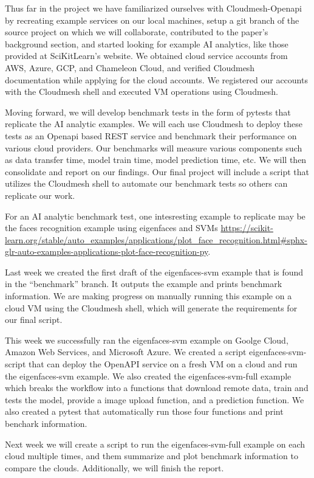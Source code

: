 Thus far in the project we have familiarized ourselves with
Cloudmesh-Openapi by recreating example services on our local machines,
setup a git branch of the source project on which we will collaborate,
contributed to the paper's background section, and started looking for
example AI analytics, like those provided at SciKitLearn's website. We
obtained cloud service accounts from AWS, Azure, GCP, and Chameleon
Cloud, and verified Cloudmesh documentation while applying for the cloud
accounts. We registered our accounts with the Cloudmesh shell and
executed VM operations using Cloudmesh.

Moving forward, we will develop benchmark tests in the form of pytests
that replicate the AI analytic examples. We will each use Cloudmesh to
deploy these tests as an Openapi based REST service and benchmark their
performance on various cloud providers. Our benchmarks will measure
various components such as data transfer time, model train time, model
prediction time, etc. We will then consolidate and report on our
findings. Our final project will include a script that utilizes the
Cloudmesh shell to automate our benchmark tests so others can replicate
our work.

For an AI analytic benchmark test, one intesresting example to replicate
may be the faces recognition example using eigenfaces and SVMs
\url{https://scikit-learn.org/stable/auto_examples/applications/plot_face_recognition.html\#sphx-glr-auto-examples-applications-plot-face-recognition-py}.

Last week we created the first draft of the eigenfaces-svm example that
is found in the ``benchmark'' branch. It outputs the example and prints
benchmark information. We are making progress on manually running this
example on a cloud VM using the Cloudmesh shell, which will generate the
requirements for our final script.

This week we successfully ran the eigenfaces-svm example on Goolge
Cloud, Amazon Web Services, and Microsoft Azure. We created a script
eigenfaces-svm-script that can deploy the OpenAPI service on a fresh VM
on a cloud and run the eigenfaces-svm example. We also created the
eigenfaces-svm-full example which breaks the workflow into a functions
that download remote data, train and tests the model, provide a image
upload function, and a prediction function. We also created a pytest
that automatically run those four functions and print benchark
information.

Next week we will create a script to run the eigenfaces-svm-full example
on each cloud multiple times, and them summarize and plot benchmark
information to compare the clouds. Additionally, we will finish the
report.

